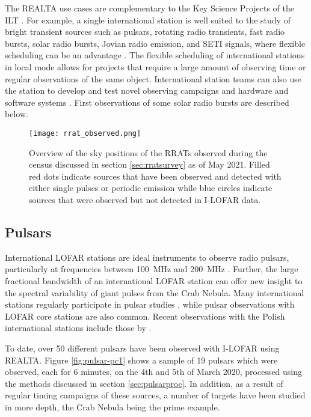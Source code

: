 The REALTA use cases are complementary to the Key Science Projects of the ILT \citep[KSP; see][]{VanHaarlem2013}. For example, a single international station is well suited to the study of bright transient sources such as pulsars, rotating radio transients, fast radio bursts, solar radio bursts, Jovian radio emission, and SETI signals, where flexible scheduling can be an advantage \citep[for example,][]{Maguire2020, Morosan2019}. The flexible scheduling of international stations in local mode allows for projects that require a large amount of observing time or regular observations of the same object. International station teams can also use the station to develop and test novel observing campaigns and hardware and software systems \citep[for example,][]{Scully2021}. First observations of some solar radio bursts are described below.

\begin{figure*}[t]
    \centering
    \texttt{[image: rrat\_observed.png]}
    \caption[Overview of the sky positions of RRATs observed during RRAT census.]{Overview of the sky positions of the RRATs observed during the census discussed in section \ref{sec:rratsurvey} as of May 2021. Filled red dots indicate sources that have been observed and detected with either single pulses or periodic emission while blue circles indicate sources that were observed but not detected in I-LOFAR data.}
    \label{fig:rrat-pc1}
\end{figure*}

\subsection{Pulsars}

International LOFAR stations are ideal instruments to observe radio pulsars, particularly at frequencies between 100~MHz and 200~MHz \citep{Stappers2011, Bilous2014, Noutsos2015}. Further, the large fractional bandwidth of an international LOFAR station can offer new insight to the spectral variability of giant pulses from the Crab Nebula. Many international stations regularly participate in pulsar studies \citep[for example,][]{Mereghetti2016, Bondonneau2017, Hermsen2018, Donner2019}, while pulsar observations with LOFAR core stations \citep[for example,][]{Bilous2014, Bilous2020} are also common. Recent observations with the Polish international stations include those by \cite{Blaszkiewicz2020}. 

To date, over 50 different pulsars have been observed with I-LOFAR using REALTA. Figure \ref{fig:pulsar-pc1} shows a sample of 19 pulsars which were observed, each for 6 minutes, on the 4th and 5th of March 2020, processed using the methods discussed in section \ref{sec:pulsarproc}. In addition, as a result of regular timing campaigns of these sources, a number of targets have been studied in more depth, the Crab Nebula being the prime example. 

